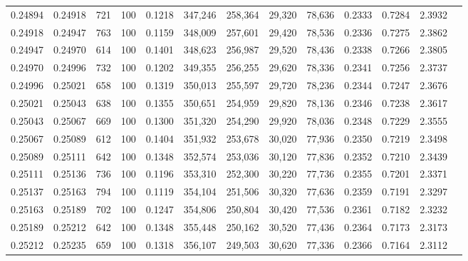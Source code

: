 \begin{tabular}{rrrrrrrrrrrrr}
0.24894 & 0.24918 &   721 & 100 &                                     0.1218 & 347,246 & 258,364 &  29,320 &  78,636 & 0.2333 & 0.7284 & 2.3932 \\
0.24918 & 0.24947 &   763 & 100 &                                     0.1159 & 348,009 & 257,601 &  29,420 &  78,536 & 0.2336 & 0.7275 & 2.3862 \\
0.24947 & 0.24970 &   614 & 100 &                                     0.1401 & 348,623 & 256,987 &  29,520 &  78,436 & 0.2338 & 0.7266 & 2.3805 \\
0.24970 & 0.24996 &   732 & 100 &                                     0.1202 & 349,355 & 256,255 &  29,620 &  78,336 & 0.2341 & 0.7256 & 2.3737 \\
0.24996 & 0.25021 &   658 & 100 &                                     0.1319 & 350,013 & 255,597 &  29,720 &  78,236 & 0.2344 & 0.7247 & 2.3676 \\
0.25021 & 0.25043 &   638 & 100 &                                     0.1355 & 350,651 & 254,959 &  29,820 &  78,136 & 0.2346 & 0.7238 & 2.3617 \\
0.25043 & 0.25067 &   669 & 100 &                                     0.1300 & 351,320 & 254,290 &  29,920 &  78,036 & 0.2348 & 0.7229 & 2.3555 \\
0.25067 & 0.25089 &   612 & 100 &                                     0.1404 & 351,932 & 253,678 &  30,020 &  77,936 & 0.2350 & 0.7219 & 2.3498 \\
0.25089 & 0.25111 &   642 & 100 &                                     0.1348 & 352,574 & 253,036 &  30,120 &  77,836 & 0.2352 & 0.7210 & 2.3439 \\
0.25111 & 0.25136 &   736 & 100 &                                     0.1196 & 353,310 & 252,300 &  30,220 &  77,736 & 0.2355 & 0.7201 & 2.3371 \\
0.25137 & 0.25163 &   794 & 100 &                                     0.1119 & 354,104 & 251,506 &  30,320 &  77,636 & 0.2359 & 0.7191 & 2.3297 \\
0.25163 & 0.25189 &   702 & 100 &                                     0.1247 & 354,806 & 250,804 &  30,420 &  77,536 & 0.2361 & 0.7182 & 2.3232 \\
0.25189 & 0.25212 &   642 & 100 &                                     0.1348 & 355,448 & 250,162 &  30,520 &  77,436 & 0.2364 & 0.7173 & 2.3173 \\
0.25212 & 0.25235 &   659 & 100 &                                     0.1318 & 356,107 & 249,503 &  30,620 &  77,336 & 0.2366 & 0.7164 & 2.3112 \\

\end{tabular}
